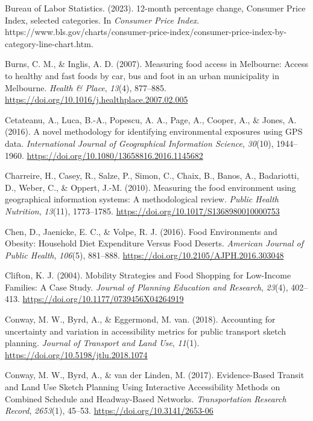 \documentclass[
  letterpaper,
  number,
  review,
  3p]{elsarticle}
\newlength{\cslhangindent}
\newenvironment{CSLReferences}[2] %
 {\begin{list}{}{%
  \setlength{\itemindent}{0pt}
  \setlength{\leftmargin}{0pt}
  \setlength{\parsep}{0pt}
  \ifodd #1
   \setlength{\leftmargin}{\cslhangindent}
   \setlength{\itemindent}{-1\cslhangindent}
  \fi
  \setlength{\itemsep}{#2\baselineskip}}}
 {\end{list}}
\begin{document}
\begin{CSLReferences}{1}{0}
Bureau of Labor Statistics. (2023). 12-month percentage change,
{Consumer Price Index}, selected categories. In \emph{Consumer Price
Index}.
https://www.bls.gov/charts/consumer-price-index/consumer-price-index-by-category-line-chart.htm.

Burns, C. M., \& Inglis, A. D. (2007). Measuring food access in
{Melbourne}: {Access} to healthy and fast foods by car, bus and foot in
an urban municipality in {Melbourne}. \emph{Health \& Place},
\emph{13}(4), 877--885.
\url{https://doi.org/10.1016/j.healthplace.2007.02.005}

Cetateanu, A., Luca, B.-A., Popescu, A. A., Page, A., Cooper, A., \&
Jones, A. (2016). A novel methodology for identifying environmental
exposures using {GPS} data. \emph{International Journal of Geographical
Information Science}, \emph{30}(10), 1944--1960.
\url{https://doi.org/10.1080/13658816.2016.1145682}

Charreire, H., Casey, R., Salze, P., Simon, C., Chaix, B., Banos, A.,
Badariotti, D., Weber, C., \& Oppert, J.-M. (2010). Measuring the food
environment using geographical information systems: A methodological
review. \emph{Public Health Nutrition}, \emph{13}(11), 1773--1785.
\url{https://doi.org/10.1017/S1368980010000753}

Chen, D., Jaenicke, E. C., \& Volpe, R. J. (2016). Food {Environments}
and {Obesity}: {Household Diet Expenditure Versus Food Deserts}.
\emph{American Journal of Public Health}, \emph{106}(5), 881--888.
\url{https://doi.org/10.2105/AJPH.2016.303048}

Clifton, K. J. (2004). Mobility {Strategies} and {Food Shopping} for
{Low-Income Families}: {A Case Study}. \emph{Journal of Planning
Education and Research}, \emph{23}(4), 402--413.
\url{https://doi.org/10.1177/0739456X04264919}

Conway, M. W., Byrd, A., \& Eggermond, M. van. (2018). Accounting for
uncertainty and variation in accessibility metrics for public transport
sketch planning. \emph{Journal of Transport and Land Use}, \emph{11}(1).
\url{https://doi.org/10.5198/jtlu.2018.1074}

Conway, M. W., Byrd, A., \& van der Linden, M. (2017). Evidence-{Based
Transit} and {Land Use Sketch Planning Using Interactive Accessibility
Methods} on {Combined Schedule} and {Headway-Based Networks}.
\emph{Transportation Research Record}, \emph{2653}(1), 45--53.
\url{https://doi.org/10.3141/2653-06}


\end{CSLReferences}
\end{document}
